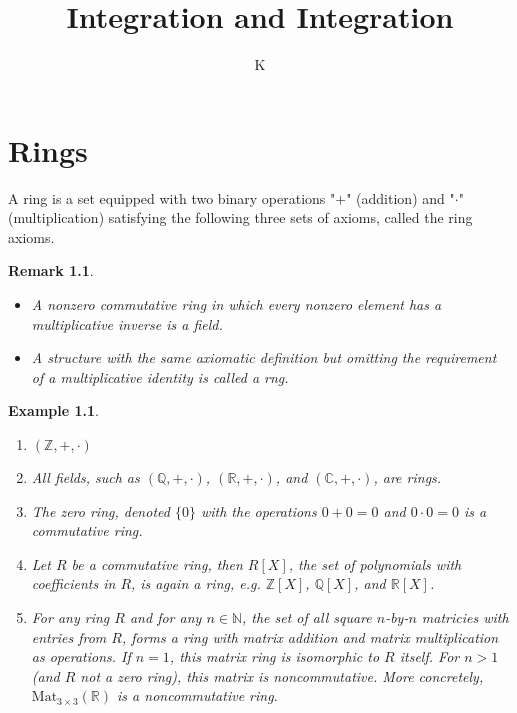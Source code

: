 \documentclass[a4paper]{book}
\title{Integration and Integration}
\author{K}
\theoremstyle{break}
\newtheorem{example}{Example}
\theoremstyle{plain}
\newtheorem{remark}{Remark}
\begin{document}

\chapter{Rings}

\begin{definition}[Ring]
    A {\color{maththen}ring} is a {\color{mathif}set} equipped with two {\color{mathif}binary operations} "\(+\)" ({\color{mathrem}addition}) and "\(\cdot\)" ({\color{mathrem}multiplication}) satisfying the following three sets of {\color{mathif}axioms}, called the {\color{mathrem}ring axioms}.
\end{definition}

\begin{remark}
    \begin{itemize}
        \item A nonzero commutative ring in which every nonzero element has a multiplicative inverse is a field.
        \item A structure with the same axiomatic definition but omitting the requirement of a multiplicative identity is called a rng.
    \end{itemize}
\end{remark}

\begin{example}
    \begin{enumerate}
        \item \((\mathbb{Z}, +, \cdot)\)
        \item All fields, such as \((\mathbb{Q}, +, \cdot)\), \((\mathbb{R}, +, \cdot)\), and \((\mathbb{C}, +, \cdot)\), are rings.
        \item The zero ring, denoted \(\{0\}\) with the operations \(0 + 0 = 0\) and \(0 \cdot 0 = 0\) is a commutative ring.
        \item Let \(R\) be a commutative ring, then \(R[X]\), the set of polynomials with coefficients in \(R\), is again a ring, e.g. \(\mathbb{Z}[X]\), \(\mathbb{Q}[X]\), and \(\mathbb{R}[X]\).
        \item For any ring \(R\) and for any \(n \in \mathbb{N}\), the set of all square \(n\)-by-\(n\) matricies with entries from \(R\), forms a ring with matrix addition and matrix multiplication as operations. If \(n = 1\), this matrix ring is isomorphic to \(R\) itself. For \(n > 1\) (and \(R\) not a zero ring), this matrix is noncommutative. More concretely, \(\text{Mat}_{3 \times 3}(\mathbb{R})\) is a noncommutative ring. 
    \end{enumerate}
\end{example}
\end{document}
